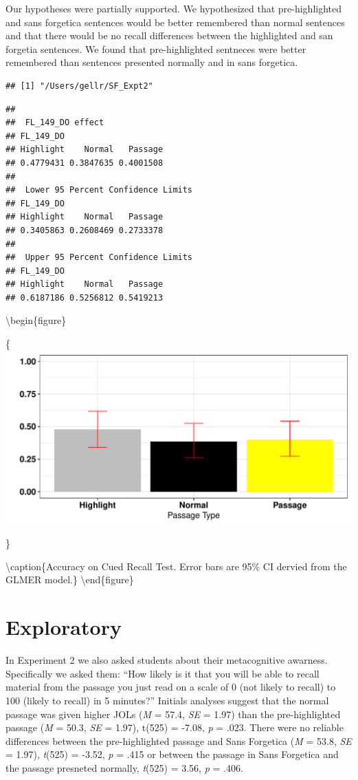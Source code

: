 \documentclass[doc]{apa6}
\begin{document}
Our hypotheses were partially supported. We hypothesized that pre-highlighted and sans forgetica sentences would be better remembered than normal sentences and that there would be no recall differences between the highlighted and san forgetia sentences. We found that pre-highlighted sentneces were better remembered than sentences presented normally and in sans forgetica.

\begin{verbatim}
## [1] "/Users/gellr/SF_Expt2"
\end{verbatim}

\begin{verbatim}
## 
##  FL_149_DO effect
## FL_149_DO
## Highlight    Normal   Passage 
## 0.4779431 0.3847635 0.4001508 
## 
##  Lower 95 Percent Confidence Limits
## FL_149_DO
## Highlight    Normal   Passage 
## 0.3405863 0.2608469 0.2733378 
## 
##  Upper 95 Percent Confidence Limits
## FL_149_DO
## Highlight    Normal   Passage 
## 0.6187186 0.5256812 0.5419213
\end{verbatim}

\textbackslash{}begin\{figure\}

\{\centering \includegraphics{SF_Paper_files/figure-latex/unnamed-chunk-2-1}

\}

\textbackslash{}caption\{Accuracy on Cued Recall Test. Error bars are 95\% CI dervied from the GLMER model.\}\label{fig:unnamed-chunk-2}
\textbackslash{}end\{figure\}

\hypertarget{exploratory}{%
\section{Exploratory}\label{exploratory}}

In Experiment 2 we also asked students about their metacognitive awarness. Specifically we asked them: \enquote{How likely is it that you will be able to recall material from the passage you just read on a scale of 0 (not likely to recall) to 100 (likely to recall) in 5 minutes?} Initials analyses suggest that the normal passage was given higher JOLs (\emph{M} = 57.4, \emph{SE} = 1.97) than the pre-highlighted passage (\emph{M} = 50.3, \emph{SE} = 1.97), t(525) = -7.08, \emph{p} = .023. There were no reliable differences between the pre-highlighted passage and Sans Forgetica (\emph{M} = 53.8, \emph{SE} = 1.97), \emph{t}(525) = -3.52, \emph{p} = .415 or between the passage in Sans Forgetica and the passage presneted normally, \emph{t}(525) = 3.56, \emph{p} = .406.
\end{document}
